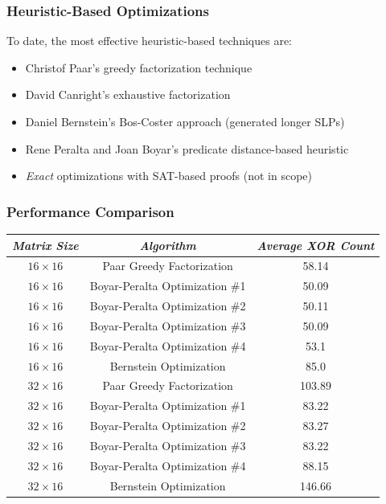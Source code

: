 \documentclass[handout,10pt]{beamer}
\newcommand{\cmark}{\ding{51}}%
\newcommand{\xmark}{\ding{55}}%
\begin{document}
\begin{frame}
	\frametitle{Heuristic-Based Optimizations}
	To date, the most effective heuristic-based techniques are:
	\begin{itemize}
		\item Christof Paar's greedy factorization technique \pause \cmark
		\item David Canright's exhaustive factorization \pause \cmark
		\item Daniel Bernstein's Bos-Coster approach \pause \xmark (generated longer SLPs)
		\item Rene Peralta and Joan Boyar's predicate distance-based heuristic \pause \cmark
		\item \emph{Exact} optimizations with SAT-based proofs \pause \xmark (not in scope)
	\end{itemize}
\end{frame}


\begin{frame}
	\frametitle{Performance Comparison}
\begin{table}[h]
\begin{center}
	\begin{tabular}{| c | c | c |} \hline
		\emph{Matrix Size} & \emph{Algorithm} & \emph{Average XOR Count} \\ \hline
		$16 \times 16$ & Paar Greedy Factorization & 58.14 \\
		$16 \times 16$ & Boyar-Peralta Optimization \#1 & 50.09 \\
		$16 \times 16$ & Boyar-Peralta Optimization \#2 & 50.11 \\
		$16 \times 16$ & Boyar-Peralta Optimization \#3 & 50.09 \\
		$16 \times 16$ & Boyar-Peralta Optimization \#4 & 53.1 \\
		$16 \times 16$ & Bernstein Optimization & 85.0 \\ \hline
		$32 \times 16$ & Paar Greedy Factorization & 103.89 \\
		$32 \times 16$ & Boyar-Peralta Optimization \#1 & 83.22 \\
		$32 \times 16$ & Boyar-Peralta Optimization \#2 & 83.27 \\
		$32 \times 16$ & Boyar-Peralta Optimization \#3 & 83.22 \\
		$32 \times 16$ & Boyar-Peralta Optimization \#4 & 88.15 \\
		$32 \times 16$ & Bernstein Optimization & 146.66 \\ \hline
	\end{tabular}
\end{center}
\end{table}
\end{frame}
\end{document}
